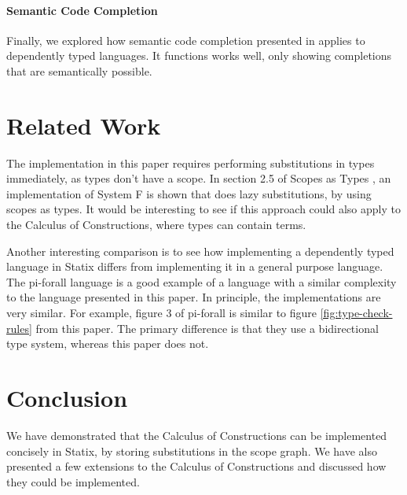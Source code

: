 \documentclass[a4paper,UKenglish,cleveref, autoref, thm-restate]{oasics-v2021}
\begin{document}
\paragraph*{Semantic Code Completion}
Finally, we explored how semantic code completion presented in \cite{codecompletion} applies to dependently typed languages. It functions works well, only showing completions that are semantically possible.


\section{Related Work}
The implementation in this paper requires performing substitutions in types immediately, as types don't have a scope. In section 2.5 of Scopes as Types \cite{scopes_as_types}, an implementation of System F is shown that does lazy substitutions, by using scopes as types. It would be interesting to see if this approach could also apply to the Calculus of Constructions, where types can contain terms. 

Another interesting comparison is to see how implementing a dependently typed language in Statix differs from implementing it in a general purpose language. The pi-forall language\cite{pi_forall} is a good example of a language with a similar complexity to the language presented in this paper. In principle, the implementations are very similar. For example, figure 3 of pi-forall is similar to figure \ref{fig:type-check-rules} from this paper. The primary difference is that they use a bidirectional type system, whereas this paper does not.

\section{Conclusion}

We have demonstrated that the Calculus of Constructions can be implemented concisely in Statix, by storing substitutions in the scope graph. We have also presented a few extensions to the Calculus of Constructions and discussed how they could be implemented.




\end{document}
